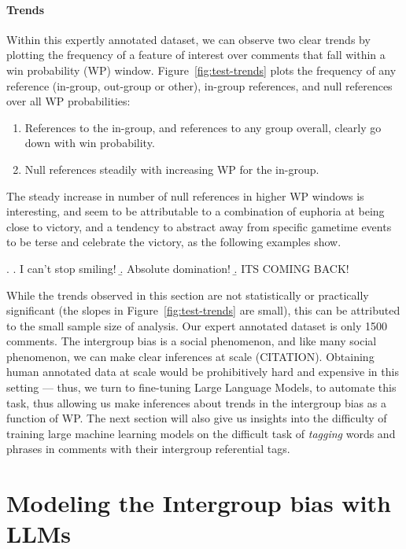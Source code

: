 \paragraph{Trends} Within this expertly annotated dataset, we can observe two clear trends by plotting the frequency of a feature of interest over comments that fall within a win probability (WP) window. Figure~\ref{fig:test-trends} plots the frequency of any reference (in-group, out-group or other), in-group references, and null references over all WP probabilities:

\begin{enumerate}
    \item References to the in-group, and references to any group overall, clearly go down with win probability.
    \item Null references steadily with increasing WP for the in-group.
\end{enumerate}

The steady increase in number of null references in higher WP windows is interesting, and seem to be attributable to a combination of euphoria at being close to victory, and a tendency to abstract away from specific gametime events to be terse and celebrate the victory, as the following examples show.

\ex. \a. I can't stop smiling!
     \b. Absolute domination!
     \b. ITS COMING BACK!

While the trends observed in this section are not statistically or practically significant (the slopes in Figure~\ref{fig:test-trends} are small), this can be attributed to the small sample size of analysis. Our expert annotated dataset is only 1500 comments. The intergroup bias is a social phenomenon, and like many social phenomenon, we can make clear inferences at scale (CITATION). Obtaining human annotated data at scale would be prohibitively hard and expensive in this setting --- thus, we turn to fine-tuning Large Language Models, to automate this task, thus allowing us make inferences about trends in the intergroup bias as a function of WP. The next section will also give us insights into the difficulty of training large machine learning models on the difficult task of \emph{tagging} words and phrases in comments with their intergroup referential tags.

\section{Modeling the Intergroup bias with LLMs}
\label{sec:football-models}

